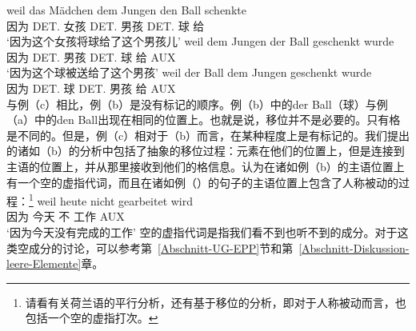 \eal
\label{ex-passive-German-no-movement}
\ex 
\gll weil das Mädchen dem Jungen den Ball schenkte\\
     因为 DET.\nom{} 女孩 DET.\dat{} 男孩 DET.\acc{} 球 给\\
\glt `因为这个女孩将球给了这个男孩儿'
\ex 
\gll weil dem Jungen der Ball geschenkt wurde\\
	 因为 DET.\dat{} 男孩 DET.\nom{} 球 给 AUX\\
\glt `因为这个球被送给了这个男孩'
\ex 
\gll weil der Ball dem Jungen geschenkt wurde\\
     因为 DET.\nom{} 球 DET.\dat{} 男孩 给 AUX\\
\zl
与例（c）相比，例（b）是没有标记的顺序。例（b）中的der Ball（球）与例（a）中的den Ball出现在相同的位置上。也就是说，移位并不是必要的。只有格是不同的。但是，例（c）相对于（b）而言，在某种程度上是有标记的。我们提出的诸如（b）的分析中包括了抽象的移位过程：元素在他们的位置上，但是连接到主语的位置上，并从那里接收到他们的格信息。\citet[]{Grewendorf93}认为在诸如例（b）的主语位置上有一个空的虚指代词，而且在诸如例（）的句子的主语位置上包含了人称被动的过程：\footnote{
请看有关荷兰语的平行分析，还有基于移位的分析，即对于人称被动而言，也包括一个空的虚指打次。
}
\ea
\gll weil heute nicht gearbeitet wird\\
	 因为 今天 不 工作 AUX\\
\glt `因为今天没有完成的工作'
\z
空的虚指代词是指我们看不到也听不到的成分。对于这类空成分的讨论，可以参考第~\ref{Abschnitt-UG-EPP}节和第~\ref{Abschnitt-Diskussion-leere-Elemente}章。

